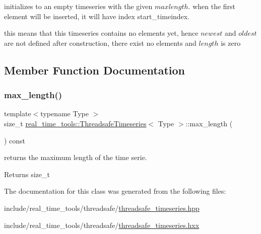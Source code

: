 initializes to an empty timeseries with the given $ maxlength $. when the first element will be inserted, it will have index start\+\_\+timeindex. 

this means that this timeseries contains no elements yet, hence $ newest $ and $ oldest $ are not defined after construction, there exist no elements and $length$ is zero 

\subsection{Member Function Documentation}
\mbox{\label{classreal__time__tools_1_1ThreadsafeTimeseries_a14a749296f8728f9fa344e0bc63d6926}} 
\subsubsection{\texorpdfstring{max\+\_\+length()}{max\_length()}}
{\footnotesize\ttfamily template$<$typename Type $>$ \\
size\+\_\+t \hyperlink{classreal__time__tools_1_1ThreadsafeTimeseries}{real\+\_\+time\+\_\+tools\+::\+Threadsafe\+Timeseries}$<$ Type $>$\+::max\+\_\+length (\begin{DoxyParamCaption}{ }\end{DoxyParamCaption}) const\hspace{0.3cm}{\ttfamily [virtual]}}



returns the maximum length of the time serie. 

\begin{DoxyReturn}{Returns}
size\+\_\+t 
\end{DoxyReturn}


The documentation for this class was generated from the following files\+:\begin{DoxyCompactItemize}
\item 
include/real\+\_\+time\+\_\+tools/threadsafe/\hyperlink{threadsafe__timeseries_8hpp}{threadsafe\+\_\+timeseries.\+hpp}\item 
include/real\+\_\+time\+\_\+tools/threadsafe/\hyperlink{threadsafe__timeseries_8hxx}{threadsafe\+\_\+timeseries.\+hxx}\end{DoxyCompactItemize}
